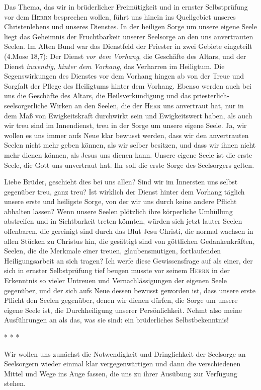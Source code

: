 \documentclass[a5paper,openany]{book}
\begin{document}
Das Thema, das wir in brüderlicher Freimütigkeit und in ernster Selbstprüfung vor dem \textsc{Herrn} besprechen wollen, führt uns hinein ins Quellgebiet unseres Christenlebens und unseres Dienstes. In der heiligen Sorge um unsere eigene Seele liegt das Geheimnis der Fruchtbarkeit unserer Seelsorge an den uns anvertrauten Seelen. Im Alten Bund war das Dienstfeld der Priester in zwei Gebiete eingeteilt (4.Mose 18,7): Der Dienst \emph{vor dem Vorhang}, die Geschäfte des Altars, und der Dienst \emph{inwendig, hinter dem Vorhang}, das Verharren im Heiligtum. Die Segenswirkungen des Dienstes vor dem Vorhang hingen ab von der Treue und Sorgfalt der Pflege des Heiligtums hinter dem Vorhang. Ebenso werden auch bei uns die Geschäfte des Altars, die Heilsverkündigung und das priesterlich-seelsorgerliche Wirken an den Seelen, die der \textsc{Herr} uns anvertraut hat, nur in dem Maß von Ewigkeitskraft durchwirkt sein und Ewigkeitswert haben, als auch wir treu sind im Innendienst, treu in der Sorge um unsere eigene Seele. Ja, wir wollen es uns immer aufs Neue klar bewusst werden, dass wir den anvertrauten Seelen nicht mehr geben können, als wir selber besitzen, und dass wir ihnen nicht mehr dienen können, als Jesus uns dienen kann. Unsere eigene Seele ist die erste Seele, die Gott uns unvertraut hat. Ihr soll die erste Sorge des Seelsorgers gelten.
\par
Liebe Brüder, geschieht dies bei uns allen? Sind wir im Innersten uns selbst gegenüber treu, ganz treu? Ist wirklich der Dienst hinter dem Vorhang täglich unsere erste und heiligste Sorge, von der wir uns durch keine andere Pflicht abhalten lassen? Wenn unsere Seelen plötzlich ihre körperliche Umhüllung abstreifen und in Sichtbarkeit treten könnten, würden sich jetzt lauter Seelen offenbaren, die gereinigt sind durch das Blut Jesu Christi, die normal wachsen in allen Stücken zu Christus hin, die gesättigt sind von göttlichen Gedankenkräften, Seelen, die die Merkmale einer treuen, glaubensmutigen, fortlaufenden Heiligungsarbeit an sich tragen? Ich werfe diese Gewissensfrage auf als einer, der sich in ernster Selbstprüfung tief beugen musste vor seinem \textsc{Herrn} in der Erkenntnis so vieler Untreuen und Vernachlässigungen der eigenen Seele gegenüber, und der sich aufs Neue dessen bewusst geworden ist, dass unsere erste Pflicht den Seelen gegenüber, denen wir dienen dürfen, die Sorge um unsere eigene Seele ist, die Durchheiligung unserer Persönlichkeit. Nehmt also meine Ausführungen an als das, was sie sind: ein brüderliches Selbstbekenntnis!
\begin{center}
* * *
\end{center}
\par
Wir wollen uns zunächst die Notwendigkeit und Dringlichkeit der Seelsorge an Seelsorgern wieder einmal klar vergegenwärtigen und dann die verschiedenen Mittel und Wege ins Auge fassen, die uns zu ihrer Ausübung zur Verfügung stehen.
\renewcommand\thechapter{\Roman{chapter}}
\setcounter{section}{1}
\end{document}
